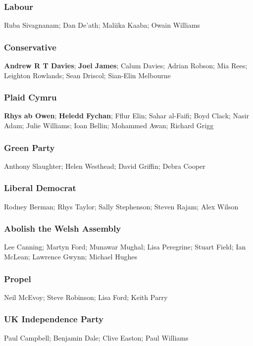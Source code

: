 \begin{resultsiii}
	\subsubsection*{Labour}
	Ruba Sivagnanam; Dan De'ath; Maliika Kaaba; Owain Williams
	
	\subsubsection*{Conservative}
	\textbf{Andrew R T Davies}; \textbf{Joel James}; Calum Davies; Adrian Robson; Mia Rees; Leighton Rowlands; Sean Driscol; Sian-Elin Melbourne
	
	\subsubsection*{Plaid Cymru}
	\textbf{Rhys ab Owen}; \textbf{Heledd Fychan}; Fflur Elin; Sahar al-Faifi; Boyd Clack; Nasir Adam; Julie Williams; Ioan Bellin; Mohammed Awan; Richard Grigg
	
	\subsubsection*{Green Party}
	Anthony Slaughter; Helen Westhead; David Griffin; Debra Cooper
	
	\subsubsection*{Liberal Democrat}
	Rodney Berman; Rhys Taylor; Sally Stephenson; Steven Rajam; Alex Wilson
	
	\subsubsection*{Abolish the Welsh Assembly}
	Lee Canning; Martyn Ford; Munawar Mughal; Lisa Peregrine; Stuart Field; Ian McLean; Lawrence Gwynn; Michael Hughes
	
	\subsubsection*{Propel}
	Neil McEvoy; Steve Robinson; Lisa Ford; Keith Parry
	
	\subsubsection*{UK Independence Party}
	Paul Campbell; Benjamin Dale; Clive Easton; Paul Williams
	

\end{resultsiii}
